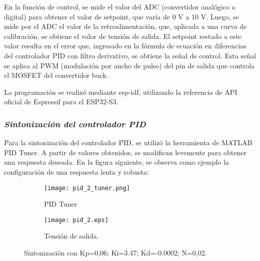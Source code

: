 En la función de control, se mide el valor del ADC (convertidor analógico a digital) para obtener el
valor de setpoint, que varía de 0 V a 10 V. Luego, se mide por el ADC el valor de la retroalimentación, que, aplicada
a una curva de calibración, se obtiene el valor de tensión de salida. El setpoint restado a este valor resulta en
el error que, ingresado en la fórmula de ecuación en diferencias del controlador PID con filtro derivativo, se obtiene
la señal de control. Esta señal se aplica al PWM (modulación por ancho de pulso) del pin de salida que controla
el MOSFET del convertidor buck.

La programación se realizó mediante esp-idf, utilizando la referencia de API oficial de Espressif para el ESP32-S3. \parencite{ESPIDF}

\subsubsection*{\it{Sintonización del controlador PID}}
\vspace{-0.25cm}

Para la sintonización del controlador PID, se utilizó la herramienta de MATLAB PID Tuner. A partir de valores obtenidos,
se modifican levemente para obtener una respuesta deseada. En la figura siguiente, se observa como ejemplo la configuración
de una respuesta lenta y robusta:

\begin{figure}[H]
    \centering

    \begin{subfigure}[b]{0.49\textwidth}
        \centering
        \texttt{[image: pid\_2\_tuner.png]}
        \caption{PID Tuner}
        \label{fig:pid2_tuner}
    \end{subfigure}
    \begin{subfigure}[b]{0.49\textwidth}
        \centering
        \texttt{[image: pid\_2.eps]}
        \caption{Tensión de salida.}
        \label{fig:pid2_micro}
    \end{subfigure}

    \vspace{-0.25cm}
    \caption{Sintonización con Kp=0,06; Ki=3.47; Kd=-0.0002; N=0,02.}
    \label{fig:sintonizacion}
\end{figure}
\vspace{-0.5cm}

